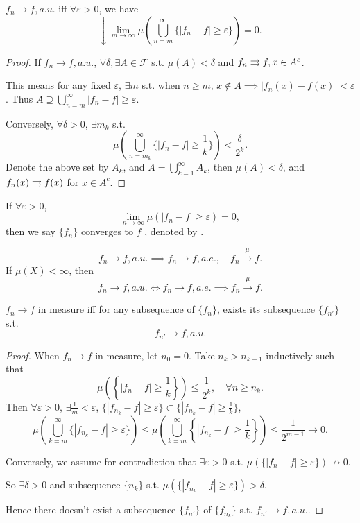 \begin{proposition}
	$f_n\to f, a.u.$ iff  $\forall \varepsilon>0$, we have
	\[
	\downarrow \lim_{m\to \infty}\mu
	\left(\bigcup_{n=m}^\infty \{|f_n-f|\ge \varepsilon\}\right) = 0.
	\]
\end{proposition}
\begin{proof}[Proof]
    If $f_n\to f, a.u.$, $\forall \delta, \exists A\in \mathscr{F}$ s.t.
	$\mu(A)<\delta$ and $f_n\rightrightarrows f, x\in A^c$.

	This means for any fixed $\varepsilon$, $\exists m$ s.t. when $n\ge m$,
	$x\notin A\implies |f_n(x) - f(x)|<\varepsilon$.
	Thus $A \supseteq \bigcup_{n=m}^\infty |f_n-f|\ge \varepsilon$.

	Conversely, $\forall \delta > 0$,  $\exists m_k$ s.t.
	\[
	\mu\left(\bigcup_{n=m_k}^\infty \{|f_n - f|\ge \frac{1}{k}\}\right)
	< \frac{\delta}{2^k}.
	\]
	Denote the above set by $A_k$, and $A = \bigcup _{k=1}^\infty A_k$,
	then $\mu(A) < \delta$, and $f_n(x)\rightrightarrows f(x)$ for $x\in A^c$.
\end{proof}

\begin{definition}
	If $\forall \varepsilon>0$,
	\[
	\lim_{n\to \infty}\mu(|f_n - f|\ge \varepsilon) = 0,
	\]
	then we say $\{f_n\}$ converges to $f$ ,
	denoted by  .
\end{definition}

\begin{theorem}
	\[
		f_n \to f, a.u. \implies f_n\to f, a.e.,\quad f_n \xrightarrow{\mu} f.
	\]
	If $\mu(X) < \infty$, then
	\[
	f_n \to f,a.u. \iff f_n\to f, a.e. \implies f_n \xrightarrow{\mu} f.
	\]
\end{theorem}

\begin{theorem}
    $f_n \to f$ in measure iff for any subsequence of $\{f_n\}$,
	exists its subsequence $\{f_{n'}\}$ s.t.
	\[
		f_{n'}\to f, a.u.
	\]
\end{theorem}
\begin{proof}[Proof]
    When $f_n \to f$ in measure, let $n_0 = 0$.
	Take $n_k > n_{k-1}$ inductively such that
	\[
	\mu\left(\left\{|f_n - f|\ge \frac{1}{k}\right\}\right) \le \frac{1}{2^k}, \quad
	\forall n\ge n_k.
	\]
	Then $\forall \varepsilon>0$, $\exists \frac{1}{m}<\varepsilon$,
	$\{|f_{n_k} - f|\ge \varepsilon\} \subset \{|f_{n_k} - f|\ge \frac{1}{k}\}$,
	\[
	\mu\left(\bigcup_{k=m}^\infty \{|f_{n_k} - f|\ge \varepsilon\}\right)
	\le \mu\left(\bigcup _{k=m}^\infty
	\left\{|f_{n_k} - f|\ge \frac{1}{k}\right\}\right)
	\le \frac{1}{2^{m-1}} \to 0.
	\]

	Conversely, we assume for contradiction that $\exists \varepsilon>0$ s.t.
	$\mu(\{|f_n - f|\ge \varepsilon\})\not\to 0$.

	So $\exists \delta>0$ and subsequence  $\{n_k\}$ s.t.
	$\mu(\{|f_{n_k} - f|\ge \varepsilon\}) > \delta$.

	Hence there doesn't exist a subsequence $\{f_{n'}\}$ of $\{f_{n_k}\}$ s.t.
	$f_{n'}\to f, a.u.$.
\end{proof}


